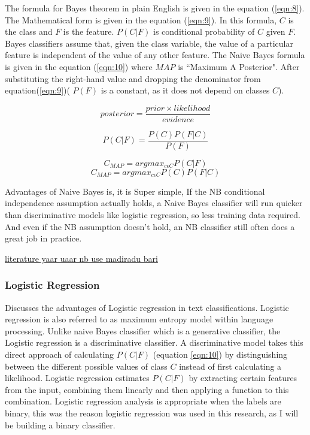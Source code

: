 The formula for Bayes theorem in plain English is given in the equation (\ref{eqn:8}). The Mathematical form is given in the equation (\ref{eqn:9}). In this formula, $C$ is the class and $F$ is the feature. $P(C|F)$ is conditional probability of $C$ given $F$. Bayes classifiers assume that, given the class variable, the value of a particular feature is independent of the value of any other feature. The Naive Bayes formula is given in the equation (\ref{eqn:10}) where $MAP$ is ``Maximum A
Posterior". After substituting the right-hand value and dropping the denominator from equation(\ref{eqn:9})( $P(F)$ is a constant, as it does not depend on classes $C$). 



\begin{equation}
\label{eqn:8}
posterior = \frac{prior \times likelihood}{evidence}
\end{equation}

\begin{equation}
\label{eqn:9}
P(C|F) = \frac{P(C) P(F|C) }{P(F)}
\end{equation}

\begin{equation}
\label{eqn:10}
C_{MAP} = argmax_{c\epsilon C} P(C|F) 
\end{equation}
\begin{equation}
\label{eqn:11}
C_{MAP} = argmax_{c\epsilon C} P(C) P(F|C)  
\end{equation}


Advantages of Naive Bayes is, it is Super simple, If the NB conditional independence assumption actually holds, a Naive Bayes classifier will run quicker than discriminative models like logistic regression, so less training data required. And even if the NB assumption doesn’t hold, an NB classifier still often does a great job in practice.

\underline{literature yaar uaar nb use madiradu bari} 

\subsubsection{Logistic Regression}

\cite{ManDaniel} Discusses the advantages of Logistic regression in text classifications. Logistic regression is also referred to as maximum entropy model within language processing. Unlike naive Bayes classifier which is a generative classifier, the Logistic regression is a discriminative classifier. A discriminative model takes this direct approach of calculating $P(C|F)$ (equation \ref{eqn:10}) by distinguishing between the different possible values of class $C$ instead of first calculating a likelihood. Logistic regression estimates $P(C|F)$ by extracting certain features from the input, combining them linearly and then applying a function to this combination. Logistic regression analysis is appropriate when the labels are binary, this was the reason logistic regression was used in this research, as I will be building a binary classifier. 

